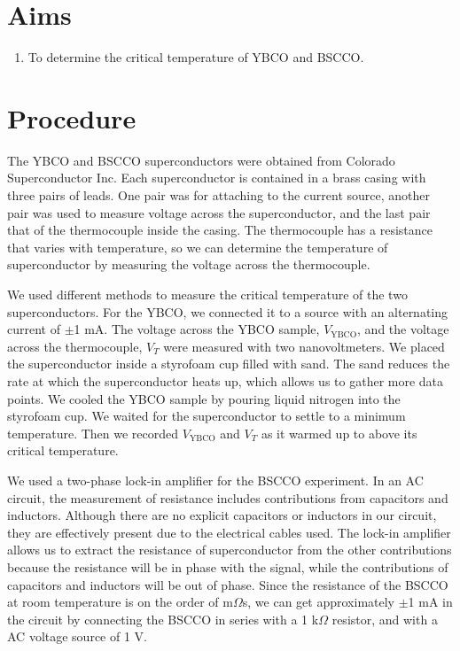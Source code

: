 \documentclass[prb,preprint]{revtex4-1}
\begin{document}
 
\section{Aims}
\begin{enumerate}
\item To determine the critical temperature of YBCO and BSCCO.
\end{enumerate}

\section{Procedure}
The YBCO and BSCCO superconductors were obtained from Colorado Superconductor Inc. Each superconductor  is contained in a brass casing with three pairs of leads. 
One pair was for attaching to the current source, another pair was used to measure voltage across the superconductor, and the last pair that of the thermocouple inside the casing. 
The thermocouple has a resistance that varies with temperature, so we can determine the  temperature of superconductor by measuring the voltage across the thermocouple. 

We used different methods to measure the critical temperature of the two superconductors.
For the YBCO, we connected it to a source with an alternating current of $\pm$1 mA. 
The voltage across the YBCO sample, $V_{\textrm{YBCO}}$, and the voltage across the thermocouple, $V_{T}$ were measured with two nanovoltmeters. We placed the superconductor inside a styrofoam cup filled with sand. 
The sand reduces the rate at which the superconductor heats up, which allows us to gather more data points. 
We cooled the YBCO sample by pouring liquid nitrogen into the styrofoam cup. We waited for the superconductor to settle to a minimum temperature. Then we recorded $V_{\textrm{YBCO}}$ and $V_{T}$ as it warmed up to above its critical temperature. 

We used a two-phase lock-in amplifier for the BSCCO experiment. In an AC circuit, the measurement of resistance includes contributions from capacitors and inductors. 
Although there are no explicit capacitors or inductors in our circuit, they are effectively present due to the electrical cables used. 
The lock-in amplifier allows us to extract the resistance of superconductor from the other contributions because the resistance will be in phase with the signal, while the contributions of capacitors and inductors will be out of phase. 
Since the resistance of the BSCCO at room temperature is on the order of m$\Omega$s, we can get approximately $\pm$1 mA in the circuit by connecting the BSCCO in series with a 1 k$\Omega$ resistor, and with a AC voltage source of 1 V. 
\end{document}
